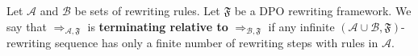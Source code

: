 \begin{definition}
    \label{termination:def:relative_termination}
     Let $\mathcal{A}$ and $\mathcal{B}$ be sets of rewriting rules. Let $\mathfrak{F}$ be a DPO rewriting framework. We say that $\mathop{\Rightarrow}_{\mathcal{A},\mathfrak{F}}$ is \textbf{terminating relative to} $\mathop{\Rightarrow}_{\mathcal{B}, \mathfrak{F}}$ if any infinite $(\mathcal{A} \mathop{\cup} \mathcal{B},\mathfrak{F})$-rewriting sequence has only a finite number of rewriting steps with rules in $\mathcal{A}$.
\end{definition}